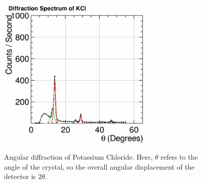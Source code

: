 \documentclass[%
 reprint,
 amsmath,amssymb,
 aps,
 pra,
]{revtex4-1}
\begin{document}
\begin{figure}[H]
	\centering
	\includegraphics[width=8cm]{Diffraction_KCl.png}
	\caption{Angular diffraction of Potassium Chloride. Here, $\theta$ refers to the angle of the crystal, so the overall angular displacement of the detector is $2 \theta$.}
	\label{fig:KCl}
\end{figure}
\end{document}

